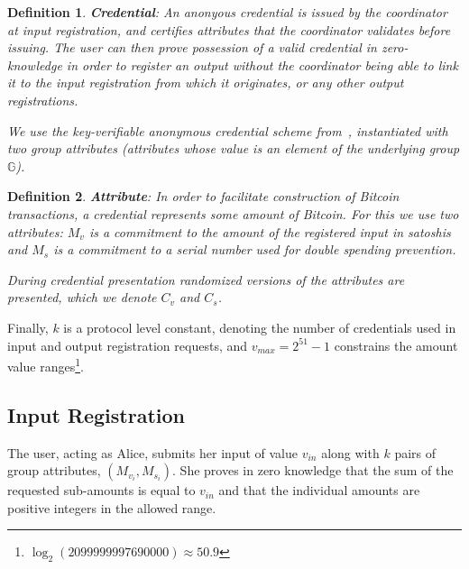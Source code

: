 \documentclass{article}
\newtheorem{definition}{Definition}[section]
\begin{document}
\begin{definition} \textbf{Credential}:
An anonyous credential is issued by the coordinator at input registration, and certifies attributes that the coordinator validates before issuing. The user can then prove possession of a valid credential in zero-knowledge in order to register an output without the coordinator being able to link it to the input registration from which it originates, or any other output registrations.

We use the key-verifiable anonymous credential scheme from~\cite{chase2019signal}, instantiated with two group attributes (attributes whose value is an element of the underlying group $\mathbb{G}$).
\end{definition}

\begin{definition}\textbf{Attribute}:
In order to facilitate construction of Bitcoin transactions, a credential represents some amount of Bitcoin. For this we use two attributes: $M_v$ is a commitment to the amount of the registered input in satoshis and $M_s$ is a commitment to a serial number used for double spending prevention.

During credential presentation randomized versions of the attributes are presented, which we denote $C_v$ and $C_s$.
\end{definition}

Finally, $k$ is a protocol level constant, denoting the number of credentials used in input and output registration requests, and $v_{\mathit{max}} = 2^{51}-1$ constrains the amount value ranges\footnote{$\log_2(2099999997690000) \approx 50.9$}.

\subsection{Input Registration} 

The user, acting as Alice, submits her input of value $v_{\mathit{in}}$ along with $k$ pairs of group attributes,
$(M_{v_i}, M_{s_i})$.
She proves in zero knowledge that the sum of the requested sub-amounts is equal to $v_{\mathit{in}}$ and that the individual amounts are positive integers in the allowed range.

\end{document}
